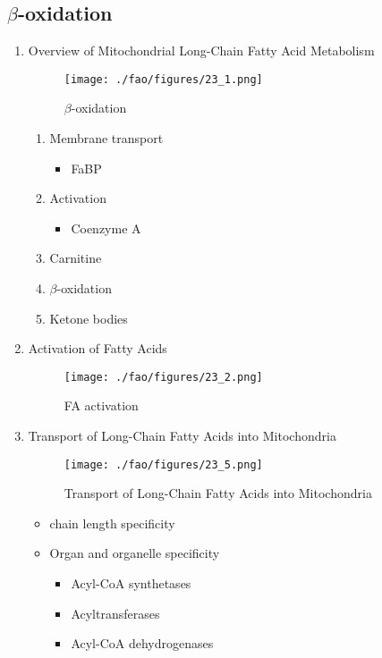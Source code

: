\documentclass{scrartcl}
\begin{document}
\subsection{\(\beta\)-oxidation}
\label{sec:orgcbf268f}
\begin{enumerate}
\item Overview of Mitochondrial Long-Chain Fatty Acid Metabolism
\label{sec:org76683f3}

\begin{figure}[htbp]
\centering
\texttt{[image: ./fao/figures/23\_1.png]}
\caption{\label{fig:org30b4be1}
\(\beta\)-oxidation}
\end{figure}

\begin{enumerate}
\item Membrane transport
\begin{itemize}
\item FaBP
\end{itemize}
\item Activation
\begin{itemize}
\item Coenzyme A
\end{itemize}
\item Carnitine
\item \(\beta\)-oxidation
\item Ketone bodies
\end{enumerate}

\item Activation of Fatty Acids
\label{sec:org45ac848}
\begin{figure}[htbp]
\centering
\texttt{[image: ./fao/figures/23\_2.png]}
\caption{\label{fig:org5b1b0cf}
FA activation}
\end{figure}

\item Transport of Long-Chain Fatty Acids into Mitochondria
\label{sec:org30ee291}
\begin{figure}[htbp]
\centering
\texttt{[image: ./fao/figures/23\_5.png]}
\caption{\label{fig:org4cac675}
Transport of Long-Chain Fatty Acids into Mitochondria}
\end{figure}

\begin{itemize}
\item chain length specificity
\item Organ and organelle specificity
\begin{itemize}
\item Acyl-CoA synthetases
\item Acyltransferases
\item Acyl-CoA dehydrogenases
\end{itemize}
\end{itemize}



\end{enumerate}
\end{document}

